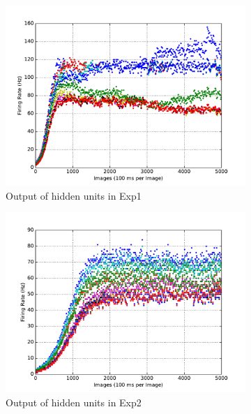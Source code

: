 \begin{figure}
\begin{subfigure}[t]{0.4\textwidth}
		\includegraphics[width=\textwidth]{pics_sdlm/05_exp_SAE_teach_long/exp1_hid_s.pdf}
		\caption{Output of hidden units in Exp1}
	\end{subfigure}
	\begin{subfigure}[t]{0.4\textwidth}
		\includegraphics[width=\textwidth]{pics_sdlm/05_exp_SAE_teach_long/exp2_hid_s.pdf}
		\caption{Output of hidden units in Exp2}
	\end{subfigure}\\
	\begin{subfigure}[t]{0.4\textwidth}

\end{subfigure}
\end{figure}
